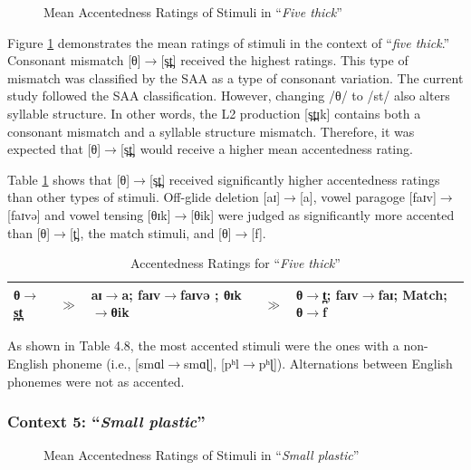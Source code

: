 \begin{figure}[!h]
  \figSpace
\centering

\caption{Mean Accentedness Ratings of Stimuli in “\textit{Five thick}”}
\label{fig:ft1}
\figSpace
\end{figure}

Figure \ref{fig:ft1} demonstrates the mean ratings of stimuli in the context of  “\textit{five thick}.” Consonant mismatch [θ]$\rightarrow$[s̪t̪] received the highest ratings. This type of mismatch was classified by the SAA as a type of consonant variation. The current study followed the SAA classification. However, changing /θ/ to /st/ also alters syllable structure. In other words, the L2 production [s̪t̪ɪk] contains both a consonant mismatch and a syllable structure mismatch. Therefore, it was expected that [θ]$\rightarrow$[s̪t̪] would receive a higher mean accentedness rating.

Table \ref{table:ft1} shows that [θ]$\rightarrow$[s̪t̪] received significantly higher accentedness ratings than other types of stimuli. Off-glide deletion [aɪ]$\rightarrow$[a], vowel paragoge [faɪv]$\rightarrow$[faɪvə] and vowel tensing [θɪk]$\rightarrow$[θik] were judged as significantly more accented than [θ]$\rightarrow$[t̪], the match stimuli, and [θ]$\rightarrow$[f]. 

\begin{table}[!h]
  \figSpace
  \centering
  \caption{Accentedness Ratings for “\textit{Five thick}” }
  \label{table:ft1}%
    \begin{tabular}{lclcl}
    \toprule
  θ$\rightarrow$s̪t̪   &$\gg$ &  aɪ$\rightarrow$a; faɪv$\rightarrow$faɪvə ; θɪk$\rightarrow$θik &$\gg$& θ$\rightarrow$t̪; faɪv$\rightarrow$faɪ; Match;  θ$\rightarrow$f\\
    \bottomrule
    \end{tabular}%
      \figSpace
\end{table}%

As shown in Table 4.8, the most accented stimuli were the ones with a non-English phoneme (i.e., [smɑl$\rightarrow$smɑɭ], [pʰl$\rightarrow$pʰɭ]). Alternations between English phonemes were not as accented.

\subsubsection{Context 5: “\textit{Small plastic}”}

\begin{figure}[!h]
  \figSpace
\centering

\caption{Mean Accentedness Ratings of Stimuli in “\textit{Small plastic}”}
\label{fig:smp1}
\figSpace
\end{figure}

